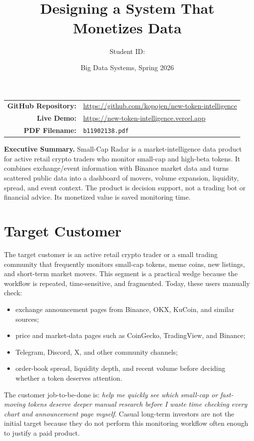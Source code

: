 \documentclass[11pt]{article}
\title{\vspace{-2em}\textbf{\product}\\
\large Designing a System That Monetizes Data}
\author{Student ID: \studentid}
\date{Big Data Systems, Spring 2026}
\newcommand{\product}{Small-Cap Radar}
\newcommand{\githuburl}{\url{https://github.com/kopojen/new-token-intelligence}}
\newcommand{\livedemo}{\url{https://new-token-intelligence.vercel.app}}
\begin{document}
\maketitle

\begin{center}
\begin{tabular}{r p{}}
\textbf{GitHub Repository:} & \githuburl \\
\textbf{Live Demo:} & \livedemo \\
\textbf{PDF Filename:} & \texttt{b11902138.pdf} \\
\end{tabular}
\end{center}

\vspace{0.5em}
\noindent\textbf{Executive Summary.}
\product{} is a market-intelligence data product for active retail crypto traders who monitor small-cap and high-beta tokens. It combines exchange/event information with Binance market data and turns scattered public data into a dashboard of movers, volume expansion, liquidity, spread, and event context. The product is decision support, not a trading bot or financial advice. Its monetized value is saved monitoring time.

\section{Target Customer}

The target customer is an active retail crypto trader or a small trading community that frequently monitors small-cap tokens, meme coins, new listings, and short-term market movers. This segment is a practical wedge because the workflow is repeated, time-sensitive, and fragmented. Today, these users manually check:
\begin{itemize}
  \item exchange announcement pages from Binance, OKX, KuCoin, and similar sources;
  \item price and market-data pages such as CoinGecko, TradingView, and Binance;
  \item Telegram, Discord, X, and other community channels;
  \item order-book spread, liquidity depth, and recent volume before deciding whether a token deserves attention.
\end{itemize}

The customer job-to-be-done is: \emph{help me quickly see which small-cap or fast-moving tokens deserve deeper manual research before I waste time checking every chart and announcement page myself}. Casual long-term investors are not the initial target because they do not perform this monitoring workflow often enough to justify a paid product.
\end{document}
